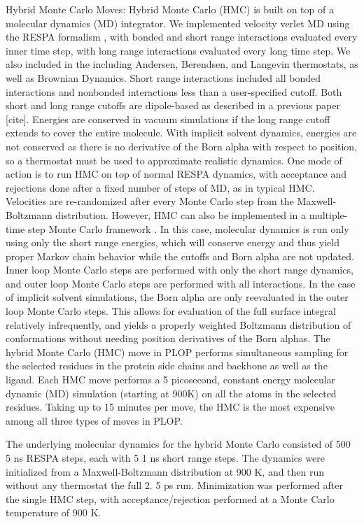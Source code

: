 Hybrid Monte Carlo Moves: Hybrid Monte Carlo (HMC) is built on top of a molecular dynamics (MD) integrator.
We implemented velocity verlet MD using the RESPA formalism \cite{tuckerman1991molecular}, with bonded and short range interactions evaluated every inner time step, with long range interactions evaluated every long time step.
We also included in the including Andersen, Berendsen, and Langevin thermostats, as well as Brownian Dynamics.
Short range interactions included all bonded interactions and nonbonded interactions less than a user-specified cutoff.
Both short and long range cutoffs are dipole-based as described in a previous paper [cite].
Energies are conserved in vacuum simulations if the long range cutoff extends to cover the entire molecule.
With implicit solvent dynamics, energies are not conserved as there is no derivative of the Born alpha with respect to position, so a thermostat must be used to approximate realistic dynamics.
One mode of action is to run HMC on top of normal RESPA dynamics, with acceptance and rejections done after a fixed number of steps of MD, as in typical HMC.
Velocities are re-randomized after every Monte Carlo step from the Maxwell-Boltzmann distribution.
However, HMC can also be implemented in a multiple-time step Monte Carlo framework \cite{hetenyi2002multiple}.
In this case, molecular dynamics is run only using only the short range energies, which will conserve energy and thus yield proper Markov chain behavior while the cutoffs and Born alpha are not updated.
Inner loop Monte Carlo steps are performed with only the short range dynamics, and outer loop Monte Carlo steps are performed with all interactions.
In the case of implicit solvent simulations, the Born alpha are only reevaluated in the outer loop Monte Carlo steps.
This allows for evaluation of the full surface integral relatively infrequently, and yields a properly weighted Boltzmann distribution of conformations without needing position derivatives of the Born alphas.
The hybrid Monte Carlo (HMC)\cite{duane1987hybrid} move in PLOP performs simultaneous sampling for the selected residues in the protein side chains and backbone as well as the ligand.
Each HMC move performs a 5 picosecond, constant energy molecular dynamic (MD) simulation (starting at 900K) on all the atoms in the selected residues.
Taking up to 15 minutes per move, the HMC is the most expensive among all three types of moves in PLOP.

The underlying molecular dynamics for the hybrid Monte Carlo consisted of 500 5 ns RESPA \cite{tuckerman1991molecular} steps, each with 5 1 ns short range steps.
The dynamics were initialized from a Maxwell-Boltzmann distribution at 900 K, and then run without any thermostat the full 2.
5 ps run.
Minimization was performed after the single HMC step, with acceptance/rejection performed at a Monte Carlo temperature of 900 K.

